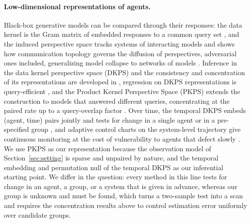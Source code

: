 \paragraph{Low-dimensional representations of agents.}
Black-box generative models can be compared through their responses: the data kernel is the Gram matrix of embedded responses to a common query set \citep{duderstadt2023comparing}, and the induced perspective space tracks systems of interacting models and shows how communication topology governs the diffusion of perspectives, adversarial ones included, generalizing model collapse \citep{shumailov2024ai} to networks of models \citep{helm2024tracking}. Inference in the data kernel perspective space (DKPS) and the consistency and concentration of its representations are developed in \citet{helm2025statistical,acharyya2024consistent,acharyya2025concentration}, regression on DKPS representations is query-efficient \citep{helm2026query}, and the Product Kernel Perspective Space (PKPS) extends the construction to models that answered different queries, concentrating at the paired rate up to a query-overlap factor \citep{pkps2026}. Over time, the temporal DKPS embeds (agent, time) pairs jointly and tests for change in a single agent or in a pre-specified group \citep{bridgeford2025detecting}, and adaptive control charts on the system-level trajectory give continuous monitoring at the cost of vulnerability to agents that defect slowly \citep{helm2026control}. We use PKPS as our representation because the observation model of Section~\ref{sec:setting} is sparse and unpaired by nature, and the temporal embedding and permutation null of the temporal DKPS as our inferential starting point. We differ in the question: every method in this line tests for change in an agent, a group, or a system that is given in advance, whereas our group is unknown and must be found, which turns a two-sample test into a scan and requires the concentration results above to control estimation error uniformly over candidate groups.


